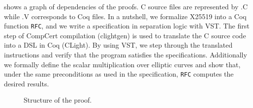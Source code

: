  shows a graph of dependencies of the proofs.
C source files are represented by {\color{doc@lstfunctions}.C} while
  {\color{doc@lstfunctions}.V} corresponds to Coq files.
In a nutshell, we formalize X25519 into a Coq function \texttt{RFC},
and we write a specification in separation logic with VST.
The first step of CompCert compilation (clightgen) is used to translate
the C source code into a DSL in Coq (CLight). By using VST,
we step through the translated instructions and verify that the program satisfies the specifications.
Additionally we formally define the scalar multiplication over elliptic curves and show that,
under the same preconditions as used in the specification, \texttt{RFC} computes the desired results.

\begin{figure}[h]
  \centering
  
  \vspace{-0.5cm}
  \caption{Structure of the proof.}
  \label{tikz:ProofOverview}
\end{figure}


%
%
